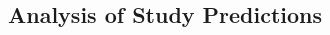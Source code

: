 \begin{CJK}{UTF8}{gbsn}

























\section{Analysis of Study Predictions\label{app9:analysisStudyPredictions}}




\end{CJK}
